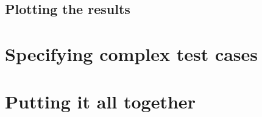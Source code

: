
\subsection{Plotting the results}





\section{Specifying complex test cases}




\section{Putting it all together}


